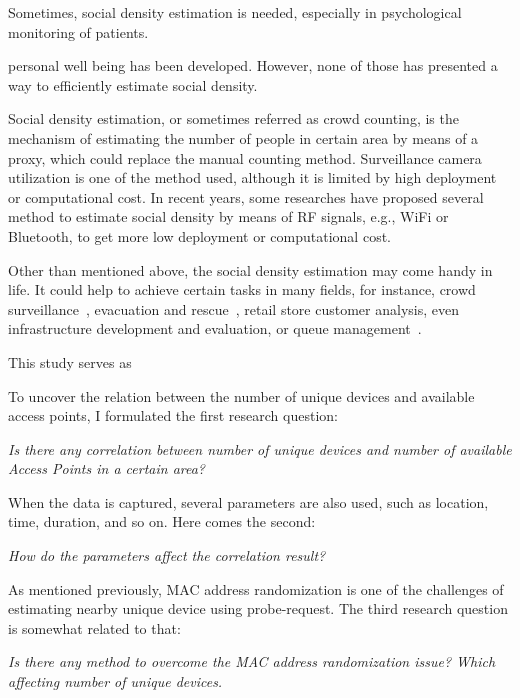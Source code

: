 Sometimes, social density estimation is needed, especially in psychological monitoring of patients.

personal well being has been developed. However, none of those has presented a way to efficiently estimate social density.

Social density estimation, or sometimes referred as crowd counting, is the mechanism of estimating the number of people in certain area by means of a proxy, which could replace the manual counting method. Surveillance camera utilization is one of the method used, although it is limited by high deployment or computational cost. In recent years, some researches have proposed several method to estimate social density by means of RF signals, e.g., WiFi or Bluetooth, to get more low deployment or computational cost.

Other than mentioned above, the social density estimation may come handy in life. It could help to achieve certain tasks in many fields, for instance, crowd surveillance~\cite{thesis050}, evacuation and rescue~\cite{thesis045}, retail store customer analysis, even infrastructure development and evaluation, or queue management~\cite{thesis012}.



This study serves as 

To uncover the relation between the number of unique devices and available access points, I formulated the first research question:
\begin{displayquote}\textit{
Is there any correlation between number of unique devices and number of available Access Points in a certain area?}
\end{displayquote}

When the data is captured, several parameters are also used, such as location, time, duration, and so on. Here comes the second:
\begin{displayquote}\textit{
How do the parameters affect the correlation result?}
\end{displayquote}

As mentioned previously, MAC address randomization is one of the challenges of estimating nearby unique device using probe-request. The third research question is somewhat related to that:
\begin{displayquote}\textit{
Is there any method to overcome the MAC address randomization issue? Which affecting number of unique devices.}
\end{displayquote}


